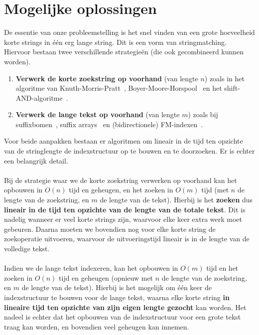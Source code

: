 \section{Mogelijke oplossingen}\label{sec:mogelijke-oplossingen}
De essentie van onze probleemstelling is het snel vinden van een grote hoeveelheid korte strings in één erg lange string.
Dit is een vorm van stringmatching.
Hiervoor bestaan twee verschillende strategieën (die ook gecombineerd kunnen worden).
\begin{enumerate}
    \item \textbf{Verwerk de korte zoekstring op voorhand} (van lengte $n$) zoals in het algoritme van Knuth-Morris-Pratt~\cite{knuth-morris-pratt}, Boyer-Moore-Horspool~\cite{boyer-moore-horspool} en het shift-AND-algoritme~\cite{shift-and}.
    \item \textbf{Verwerk de lange tekst op voorhand} (van lengte $m$) zoals bij suffixbomen~\cite{mcCreight_first_suffixtree}, suffix arrays~\cite{suffix_array_first_mention} en (bidirectionele) FM-indexen~\cite{fm_index, bi-directional_fm_index}.
\end{enumerate}
Voor beide aanpakken bestaan er algoritmen om lineair in de tijd ten opzichte van de stringlengte de indexstructuur op te bouwen en te doorzoeken.
Er is echter een belangrijk detail.
\\ \\
Bij de strategie waar we de korte zoekstring verwerken op voorhand kan het opbouwen in $O(n)$ tijd en geheugen, en het zoeken in $O(m)$ tijd (met $n$ de lengte van de zoekstring, en $m$ de lengte van de tekst).
Hierbij is het \textbf{zoeken} dus \textbf{lineair in de tijd ten opzichte van de lengte van de totale tekst}.
Dit is nadelig wanneer er veel korte strings zijn, waarvoor elke keer extra werk moet gebeuren.
Daarna moeten we bovendien nog voor elke korte string de zoekoperatie uitvoeren, waarvoor de uitvoeringstijd lineair is in de lengte van de volledige tekst.
\\ \\
Indien we de lange tekst indexeren, kan het opbouwen in $O(m)$ tijd en het zoeken in $O(n)$ tijd en geheugen (opnieuw met $n$ de lengte van de zoekstring, en $m$ de lengte van de tekst).
Hierbij is het mogelijk om één keer de indexstructuur te bouwen voor de lange tekst, waarna elke korte string \textbf{in lineaire tijd ten opzichte van zijn eigen lengte gezocht} kan worden.
Het nadeel is echter dat het opbouwen van de indexstructuur voor een grote tekst traag kan worden, en bovendien veel geheugen kan innemen.
